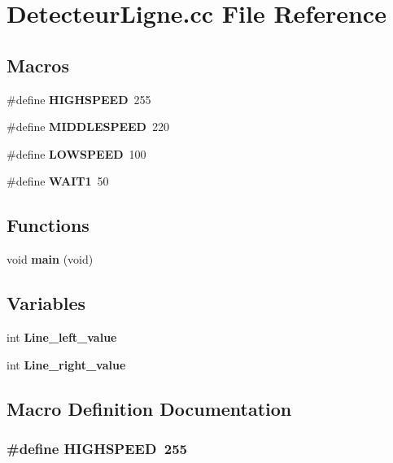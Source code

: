 \section{Detecteur\+Ligne.\+cc File Reference}
\label{_detecteur_ligne_8cc}
\subsection*{Macros}
\begin{DoxyCompactItemize}
\item 
\#define {\bf H\+I\+G\+H\+S\+P\+E\+ED}~255
\item 
\#define {\bf M\+I\+D\+D\+L\+E\+S\+P\+E\+ED}~220
\item 
\#define {\bf L\+O\+W\+S\+P\+E\+ED}~100
\item 
\#define {\bf W\+A\+I\+T1}~50
\end{DoxyCompactItemize}
\subsection*{Functions}
\begin{DoxyCompactItemize}
\item 
void {\bf main} (void)
\end{DoxyCompactItemize}
\subsection*{Variables}
\begin{DoxyCompactItemize}
\item 
int {\bf Line\+\_\+left\+\_\+value}
\item 
int {\bf Line\+\_\+right\+\_\+value}
\end{DoxyCompactItemize}


\subsection{Macro Definition Documentation}
\subsubsection[{H\+I\+G\+H\+S\+P\+E\+ED}]{\setlength{\rightskip}{0pt plus 5cm}\#define H\+I\+G\+H\+S\+P\+E\+ED~255}\label{_detecteur_ligne_8cc_ab0a1f7733eaf1448e5b3bd9f4771da81}


